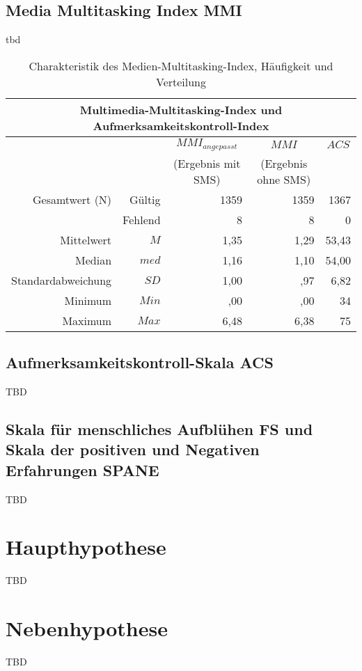 \subsection{Media Multitasking Index MMI}
tbd
\begin{table}[ht] 
    \centering
    \caption{Charakteristik des Medien-Multitasking-Index, Häufigkeit und Verteilung}
    \begin{tabular}[t]{|r r|r|r|r|} 
        \hline
        \multicolumn{5}{|c|}{\textbf{Multimedia-Multitasking-Index und Aufmerksamkeitskontroll-Index}}\\ 
        \hline       
        \multicolumn{2}{|c}{} & \multicolumn{1}{c|}{$MMI_{angepasst}$} & \multicolumn{1}{|c|}{$MMI$}& \multicolumn{1}{c|}{$ACS$}\\
        \multicolumn{2}{|c}{} & \multicolumn{1}{c|}{(Ergebnis mit SMS)} & \multicolumn{1}{|c|}{(Ergebnis ohne SMS)}& \multicolumn{1}{c|}{}\\
        \hline
        Gesamtwert (N) & Gültig & 1359 & 1359 & 1367\\
        & Fehlend & 8 & 8 & 0\\
        Mittelwert & $M$ & 1,35 & 1,29 & 53,43\\
        Median & $med$ & 1,16 & 1,10 & 54,00\\
        Standardabweichung & $SD$ & 1,00 & ,97 & 6,82\\
        Minimum & $Min$ & ,00 & ,00 & 34\\
        Maximum & $Max$ & 6,48 & 6,38 & 75\\
        \hline
    \end{tabular}
    \label{table.sozidemoZivil}
\end{table}
\subsection{Aufmerksamkeitskontroll-Skala ACS}
TBD

\subsection{Skala für menschliches Aufblühen FS und Skala der positiven und Negativen Erfahrungen SPANE}
TBD
\section{Haupthypothese}\label{label.haupthypothese}
TBD
\section{Nebenhypothese}\label{label.nebenhypothese}
TBD

